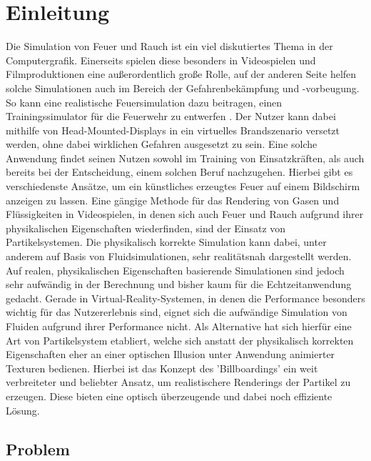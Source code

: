 \section{Einleitung}
\noindent

Die Simulation von Feuer und Rauch ist ein viel diskutiertes Thema in der Computergrafik. Einerseits
spielen diese besonders in Videospielen und Filmproduktionen eine außerordentlich große Rolle, auf der
anderen Seite helfen solche Simulationen auch im Bereich der Gefahrenbekämpfung und -vorbeugung.
So kann eine realistische Feuersimulation dazu beitragen, einen Trainingssimulator für die Feuerwehr zu
entwerfen \parencite{Schlager2017}. Der Nutzer kann dabei mithilfe von Head-Mounted-Displays in ein virtuelles Brandszenario versetzt werden,
ohne dabei wirklichen Gefahren ausgesetzt zu sein. Eine solche Anwendung findet seinen Nutzen sowohl im Training
von Einsatzkräften, als auch bereits bei der Entscheidung, einem solchen Beruf nachzugehen.
Hierbei gibt es verschiedenste Ansätze, um ein künstliches erzeugtes Feuer auf einem
Bildschirm anzeigen zu lassen. Eine gängige Methode für das Rendering von Gasen und Flüssigkeiten
in Videospielen, in denen sich auch Feuer und Rauch aufgrund ihrer physikalischen Eigenschaften
wiederfinden, sind der Einsatz von Partikelsystemen. Die physikalisch korrekte Simulation kann dabei,
unter anderem auf Basis von Fluidsimulationen, sehr realitätsnah dargestellt werden.
Auf realen, physikalischen Eigenschaften basierende Simulationen sind jedoch sehr aufwändig in der
Berechnung und bisher kaum für die Echtzeitanwendung gedacht.
Gerade in Virtual-Reality-Systemen, in denen die Performance besonders wichtig für das Nutzererlebnis sind,
eignet sich die aufwändige Simulation von Fluiden aufgrund ihrer Performance nicht. Als Alternative hat
sich hierfür eine Art von Partikelsystem etabliert, welche sich anstatt der physikalisch korrekten
Eigenschaften eher an einer optischen Illusion unter Anwendung animierter Texturen bedienen.
Hierbei ist das Konzept des 'Billboardings' ein weit verbreiteter und beliebter Ansatz,
um realistischere Renderings der Partikel zu erzeugen. Diese bieten eine optisch überzeugende und
dabei noch effiziente Lösung.



\subsection{Problem}

